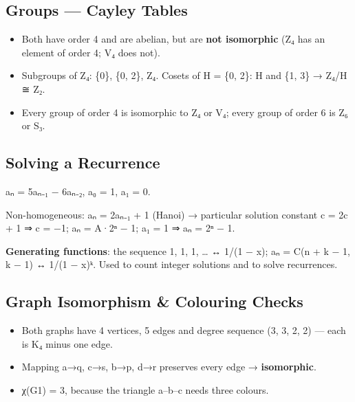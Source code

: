 \endgroup



\needspace{95pt}

\hypertarget{p2-01--84-groups--cayley-tables}{%
\subsection{Groups --- Cayley Tables}\label{p2-01--84-groups--cayley-tables}}



\begin{itemize}
\tightlist
\item
  Both have order 4 and are abelian, but are \textbf{not isomorphic} (Z₄ has an element of order 4; V₄ does not).
\item
  Subgroups of Z₄: \{0\}, \{0, 2\}, Z₄. Cosets of H = \{0, 2\}: H and \{1, 3\} → Z₄/H ≅ Z₂.
\item
  Every group of order 4 is isomorphic to Z₄ or V₄; every group of order 6 is Z₆ or S₃.
\end{itemize}

\needspace{125pt}

\hypertarget{p2-01--85-solving-a-recurrence}{%
\subsection{Solving a Recurrence}\label{p2-01--85-solving-a-recurrence}}

aₙ = 5aₙ₋₁ − 6aₙ₋₂, a₀ = 1, a₁ = 0.



Non-homogeneous: aₙ = 2aₙ₋₁ + 1 (Hanoi) → particular solution constant c = 2c + 1 ⇒ c = −1; aₙ = A·2ⁿ − 1; a₁ = 1 ⇒ aₙ = 2ⁿ − 1.

\textbf{Generating functions}: the sequence 1, 1, 1, \ldots{} ↔ 1/(1 − x); aₙ = C(n + k − 1, k − 1) ↔ 1/(1 − x)ᵏ. Used to count integer solutions and to solve recurrences.

\needspace{95pt}

\hypertarget{p2-01--86-graph-isomorphism--colouring-checks}{%
\subsection{Graph Isomorphism \& Colouring Checks}\label{p2-01--86-graph-isomorphism--colouring-checks}}



\begin{itemize}
\tightlist
\item
  Both graphs have 4 vertices, 5 edges and degree sequence (3, 3, 2, 2) --- each is K₄ minus one edge.
\item
  Mapping a→q, c→s, b→p, d→r preserves every edge → \textbf{isomorphic}.
\item
  χ(G1) = 3, because the triangle a--b--c needs three colours.
\end{itemize}

